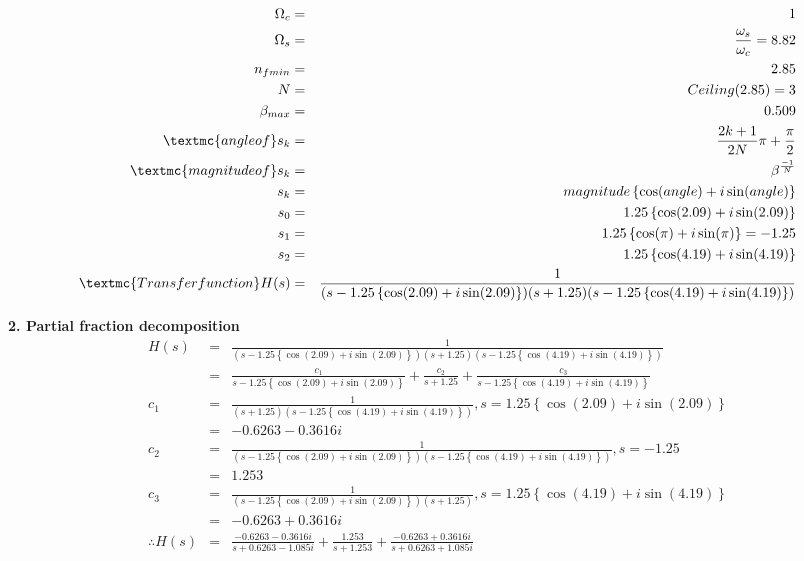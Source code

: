 ﻿\documentclass[a4j]{jarticle}
\begin{document}
\begin{eqnarray*}
\Omega_{c} &=& 1 \\
\Omega_{s} &=& \frac{\omega_s}{\omega_c} = 8.82 \\
n_{fmin} &=& 2.85 \\
N &=& Ceiling(2.85) = 3 \\
\beta_{max} &=& 0.509 \\
\textmc{angle of } s_k &=& \frac{2k+1}{2N}\pi + \frac{\pi}{2} \\
\textmc{magnitude of } s_k &=& \beta^{\frac{-1}{N}} \\
s_k &=& magnitude \left\{ \cos( angle ) + i\sin( angle) \right\} \\
s_0 &=& 1.25 \left\{ \cos(2.09) + i\sin(2.09) \right\} \\
s_1 &=& 1.25 \left\{ \cos(\pi) + i\sin(\pi) \right\} = -1.25\\
s_2 &=& 1.25 \left\{ \cos(4.19) + i\sin(4.19) \right\} \\
\textmc{Transfer function} H(s) &=& \frac{1}{(s-1.25 \left\{ \cos(2.09) + i\sin(2.09) \right\})(s+1.25)(s-1.25 \left\{ \cos(4.19) + i\sin(4.19) \right\})}
\end{eqnarray*}

{\large {\bf 2. Partial fraction decomposition}}
\begin{eqnarray*}
H(s) &=& \frac{1}{(s-1.25 \left\{ \cos(2.09) + i\sin(2.09) \right\})(s+1.25)(s-1.25 \left\{ \cos(4.19) + i\sin(4.19) \right\})}\\
     &=& \frac{c_1}{s-1.25 \left\{ \cos(2.09) + i\sin(2.09) \right\}} + \frac{c_2}{s+1.25} + \frac{c_3}{s-1.25 \left\{ \cos(4.19) + i\sin(4.19) \right\}}\\
c_1  &=& \frac{1}{(s+1.25)(s-1.25 \left\{ \cos(4.19) + i\sin(4.19) \right\})}, s = 1.25 \left\{ \cos(2.09) + i\sin(2.09) \right\} \\
     &=& -0.6263-0.3616i \\
c_2  &=& \frac{1}{(s-1.25 \left\{ \cos(2.09) + i\sin(2.09) \right\})(s-1.25 \left\{ \cos(4.19) + i\sin(4.19) \right\})}, s = -1.25 \\
     &=& 1.253 \\
c_3  &=& \frac{1}{(s-1.25 \left\{ \cos(2.09) + i\sin(2.09) \right\})(s+1.25)}, s = 1.25 \left\{ \cos(4.19) + i\sin(4.19) \right\} \\
     &=& -0.6263+0.3616i \\
\therefore H(s) &=& \frac{-0.6263-0.3616i}{s+0.6263-1.085i} + \frac{1.253}{s+1.253} + \frac{-0.6263+0.3616i}{s+0.6263+1.085i}
\end{eqnarray*}
\end{document}
